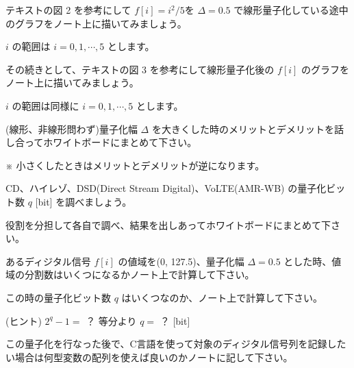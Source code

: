 \documentclass[a4paper]{jarticle}
\begin{document}


 テキストの図 2 を参考にして $f[i] = i^2/5$を $\Delta = 0.5$ で線形量子化している途中のグラフをノート上に描いてみましょう。\par
\noindent $i$ の範囲は $i = 0,1,\cdots,5$ とします。

 その続きとして、テキストの図 3 を参考にして線形量子化後の $f[i]$ のグラフをノート上に描いてみましょう。\par
\noindent $i$ の範囲は同様に $i = 0,1,\cdots,5$ とします。

 (線形、非線形問わず)量子化幅 $\Delta$ を大きくした時のメリットとデメリットを話し合ってホワイトボードにまとめて下さい。\par
\noindent ※ 小さくしたときはメリットとデメリットが逆になります。

\bigskip
 

 CD、ハイレゾ、DSD(Direct Stream Digital)、VoLTE(AMR-WB) の量子化ビット数 $q$ [bit] を調べましょう。\par
\noindent 役割を分担して各自で調べ、結果を出しあってホワイトボードにまとめて下さい。

 あるディジタル信号 $f[i]$ の値域を(0, 127.5)、量子化幅 $\Delta = 0.5$ とした時、値域の分割数はいくつになるかノート上で計算して下さい。

 この時の量子化ビット数 $q$ はいくつなのか、ノート上で計算して下さい。 \par
\noindent (ヒント) $2^q-1=$ ？ 等分より $q = $ ？ [bit] 

 この量子化を行なった後で、C言語を使って対象のディジタル信号列を記録したい場合は何型変数の配列を使えば良いのかノートに記して下さい。

\savepractime
\end{document}
